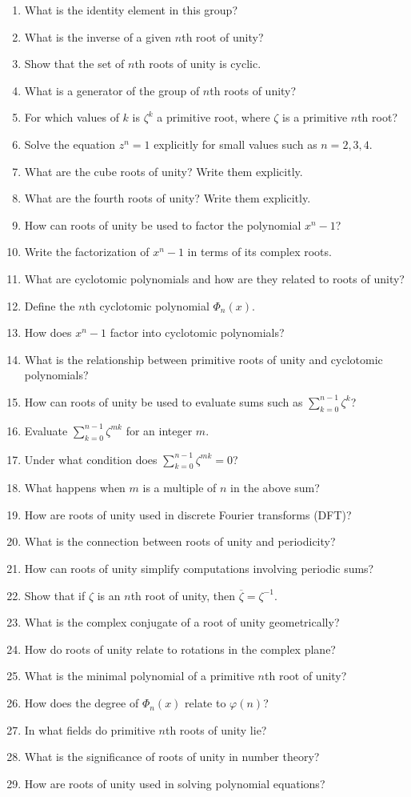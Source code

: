 \begin{enumerate}
  \item What is the identity element in this group?
  \item What is the inverse of a given $n$th root of unity?
  \item Show that the set of $n$th roots of unity is cyclic.
  \item What is a generator of the group of $n$th roots of unity?
  \item For which values of $k$ is $\zeta^k$ a primitive root, where $\zeta$ is a primitive $n$th root?
  \item Solve the equation $z^n = 1$ explicitly for small values such as $n=2,3,4$.
  \item What are the cube roots of unity? Write them explicitly.
  \item What are the fourth roots of unity? Write them explicitly.
  \item How can roots of unity be used to factor the polynomial $x^n - 1$?
  \item Write the factorization of $x^n - 1$ in terms of its complex roots.
  \item What are cyclotomic polynomials and how are they related to roots of unity?
  \item Define the $n$th cyclotomic polynomial $\Phi_n(x)$.
  \item How does $x^n - 1$ factor into cyclotomic polynomials?
  \item What is the relationship between primitive roots of unity and cyclotomic polynomials?
  \item How can roots of unity be used to evaluate sums such as $\sum_{k=0}^{n-1} \zeta^{k}$?
  \item Evaluate $\sum_{k=0}^{n-1} \zeta^{mk}$ for an integer $m$.
  \item Under what condition does $\sum_{k=0}^{n-1} \zeta^{mk} = 0$?
  \item What happens when $m$ is a multiple of $n$ in the above sum?
  \item How are roots of unity used in discrete Fourier transforms (DFT)?
  \item What is the connection between roots of unity and periodicity?
  \item How can roots of unity simplify computations involving periodic sums?
  \item Show that if $\zeta$ is an $n$th root of unity, then $\overline{\zeta} = \zeta^{-1}$.
  \item What is the complex conjugate of a root of unity geometrically?
  \item How do roots of unity relate to rotations in the complex plane?
  \item What is the minimal polynomial of a primitive $n$th root of unity?
  \item How does the degree of $\Phi_n(x)$ relate to $\varphi(n)$?
  \item In what fields do primitive $n$th roots of unity lie?
  \item What is the significance of roots of unity in number theory?
  \item How are roots of unity used in solving polynomial equations?
\end{enumerate}
